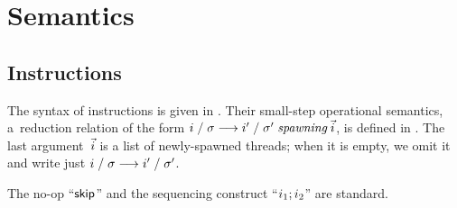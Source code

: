 \section{Semantics}
\label{sec:semantics}
\subsection{Instructions}
\label{sec:instrsemantics}
The syntax of instructions is given in . Their
small-step operational semantics, a~reduction relation of the form
$i\;/\;\sigma\longrightarrow i'\;/\;\sigma'\mathrel{\textit{spawning}}\vec{i}$,
is defined in .
%
The last argument~$\vec{i}$ is a list of newly-spawned threads;
when it is empty, we omit it
and write just $i\;/\;\sigma\longrightarrow i'\;/\;\sigma'$.
%

%
The no-op ``$\mathsf{skip}$'' and the sequencing construct
``$i_1; i_2$'' are standard.
%


